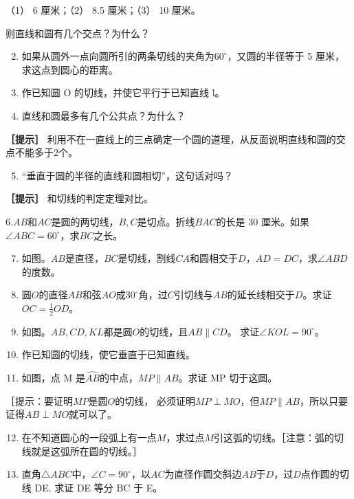 （1） 6 厘米；（2） 8.5 厘米；（3） 10 厘米。

则直线和圆有几个交点？为什么？

\begin{enumerate}
\setcounter{enumi}{1}
\item
  如果从圆外一点向圆所引的两条切线的夹角为\(60^{\circ}\)，又圆的半径等于
  5 厘米，求这点到圆心的距离。
\item
  作已知圆 O 的切线，并使它平行于已知直线 l。
\item
  直线和圆最多有几个公共点？为什么？
\end{enumerate}

\textbf{［提示］}
利用不在一直线上的三点确定一个圆的道理，从反面说明直线和圆的交点不能多于2个。

\begin{enumerate}
\setcounter{enumi}{4}
\item
  ``垂直于圆的半径的直线和圆相切''，这句话对吗？
\end{enumerate}

\textbf{［提示］} 和切线的判定定理对比。

6.\(AB\)和\(AC\)是圆的两切线，\(B, C\)是切点。折线\(BAC\)的长是 30
厘米。如果\(\angle ABC = 60^\circ\)，求\(BC\)之长。

\begin{enumerate}
\setcounter{enumi}{6}
\item
  如图。\(AB\)是直径，\(BC\)是切线，割线\(CA\)和圆相交于\(D\)，\(AD = DC\)，求\(\angle ABD\)的度数。
\item
  圆\(O\)的直径\(AB\)和弦\(AO\)成\(30^{\circ}\)角，过\(C\)引切线与\(AB\)的延长线相交于\(D\)。求证\(OC = \frac{1}{2} OD\)。
\item
  如图。\(AB, CD, KL\)都是圆\(O\)的切线，且\(AB \parallel CD\)。
  求证\(\angle KOL = 90^\circ\)。
\item
  作已知圆的切线，使它垂直于已知直线。
\item
  如图，点 M 是\(\widehat{AB}\)的中点，\(MP \parallel AB\)。求证 MP
  切于这圆。
\end{enumerate}

［提示：要证明\(MP\)是圆\(O\)的切线，
必须证明\(MP \perp MO\)，但\(MP \parallel AB\)，所以只要证得\(AB \perp MO\)就可以了。

\begin{enumerate}
\setcounter{enumi}{11}
\item
  在不知道圆心的一段弧上有一点\(M\)，求过点\(M\)引这弧的切线。［注意：弧的切线就是这弧所在圆的切线。］
\item
  直角\(\triangle ABC\)中，\(\angle C = 90^\circ\)，以\(AC\)为直径作圆交斜边\(AB\)于\(D\)，过\(D\)点作圆的切线
  DE. 求证 DE 等分 BC 于 E。
\end{enumerate}

